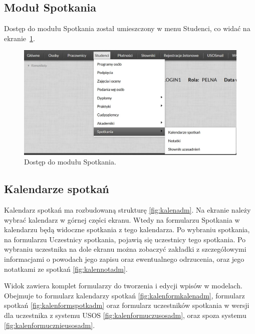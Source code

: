 \documentclass[licencjacka]{pracamgr}
\begin{document}
\subsection{Moduł Spotkania}
Dostęp do modułu Spotkania został umieszczony w menu Studenci, co widać na ekranie~\ref{fig:modspoadm}.

\begin{figure}[!]
  \includegraphics[width=\linewidth]{spotkaniaadm.jpg}
  \caption{Dostęp do modułu Spotkania.}
  \label{fig:modspoadm}
\end{figure}

\subsection{Kalendarze spotkań}
Kalendarz spotkań ma rozbudowaną strukturę \ref{fig:kalenadm}. Na ekranie należy wybrać kalendarz w górnej części ekranu. Wtedy na formularzu Spotkania w kalendarzu będą widoczne spotkania z tego kalendarza. Po wybraniu spotkania, na formularzu Uczestnicy spotkania, pojawią się uczestnicy tego spotkania. Po wybraniu uczestnika na dole ekranu można zobaczyć zakładki z szczegółowymi informacjami o powodach jego zapisu oraz ewentualnego odrzucenia, oraz jego notatkami ze spotkań \ref{fig:kalennotadm}.

Widok zawiera komplet formularzy do tworzenia i edycji wpisów w modelach. Obejmuje to formularz kalendarzy spotkań \ref{fig:kalenformkalenadm}, formularz spotkań \ref{fig:kalenformspotkadm} oraz formularz uczestników spotkania w wersji dla uczestnika z systemu USOS \ref{fig:kalenformuczusosadm}, oraz spoza systemu \ref{fig:kalenformucznieusosadm}.
\end{document}
